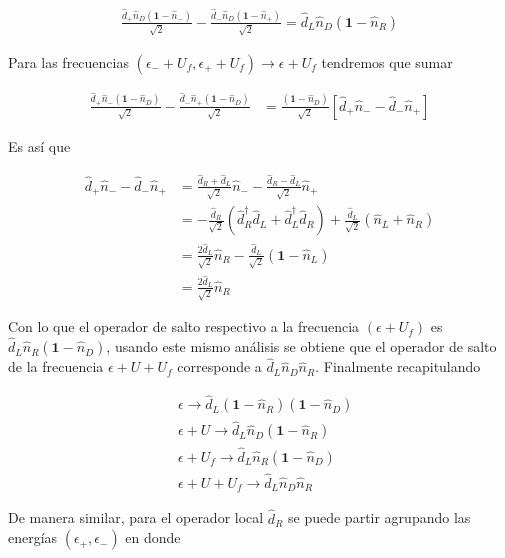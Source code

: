 \begin{appendixs}
\begin{align*}
    \frac{\hat{d}_{+}\hat{n}_{D}(\textbf{1}-\hat{n}_{-})}{\sqrt{2}} - \frac{\hat{d}_{-}\hat{n}_{D}(\textbf{1}-\hat{n}_{+})}{\sqrt{2}} = \hat{d}_{L}\hat{n}_{D}(\textbf{1}-\hat{n}_{R}) 
\end{align*}

Para las frecuencias $(\epsilon_{-}+U_{f},\epsilon_{+}+U_{f}) \to \epsilon+U_{f}$ tendremos que sumar

\begin{align*}
    \frac{\hat{d}_{+}\hat{n}_{-}(\textbf{1}-\hat{n}_{D})}{\sqrt{2}} - \frac{\hat{d}_{-}\hat{n}_{+}(\textbf{1}-\hat{n}_{D})}{\sqrt{2}} & = \frac{(\textbf{1}-\hat{n}_{D})}{\sqrt{2}}[\hat{d}_{+}\hat{n}_{-} -\hat{d}_{-}\hat{n}_{+}] 
\end{align*}

Es así que

\begin{align*}
    \hat{d}_{+}\hat{n}_{-} -\hat{d}_{-}\hat{n}_{+} & = \frac{\hat{d}_{R}+\hat{d}_{L}}{\sqrt{2}}\hat{n}_{-} - \frac{\hat{d}_{R}-\hat{d}_{L}}{\sqrt{2}}\hat{n}_{+} \\
    & = - \frac{\hat{d}_{R}}{\sqrt{2}}(\hat{d}^{\dagger}_{R}\hat{d}_{L}+ \hat{d}^{\dagger}_{L}\hat{d}_{R}) + \frac{\hat{d}_{L}}{\sqrt{2}}(\hat{n}_{L}+\hat{n}_{R}) \\
    & = \frac{2\hat{d}_{L}}{\sqrt{2}}\hat{n}_{R} - \frac{\hat{d}_{L}}{\sqrt{2}}(\textbf{1}-\hat{n}_{L}) \\
    & = \frac{2\hat{d}_{L}}{\sqrt{2}}\hat{n}_{R}
\end{align*}

Con lo que el operador de salto respectivo a la frecuencia $(\epsilon+U_{f})$ es $\hat{d}_{L}\hat{n}_{R}(\textbf{1}-\hat{n}_{D})$, usando este mismo análisis se obtiene que el operador de salto de la frecuencia $\epsilon+U+U_{f}$ corresponde a $\hat{d}_{L}\hat{n}_{D}\hat{n}_{R}$. Finalmente recapitulando

\begin{align*}
    &\epsilon \to \hat{d}_{L}(\textbf{1}-\hat{n}_{R})(\textbf{1}-\hat{n}_{D})\\
   &\epsilon + U \to \hat{d}_{L}\hat{n}_{D}(\textbf{1}-\hat{n}_{R})\\
    &\epsilon +U_{f}\to \hat{d}_{L}\hat{n}_{R}(\textbf{1}-\hat{n}_{D})\\
    &\epsilon +U+U_{f}\to \hat{d}_{L}\hat{n}_{D}\hat{n}_{R}
\end{align*}

De manera similar, para el operador local $\hat{d}_{R}$ se puede partir agrupando las energías $(\epsilon_{+},\epsilon_{-})$ en donde


\end{appendixs}

